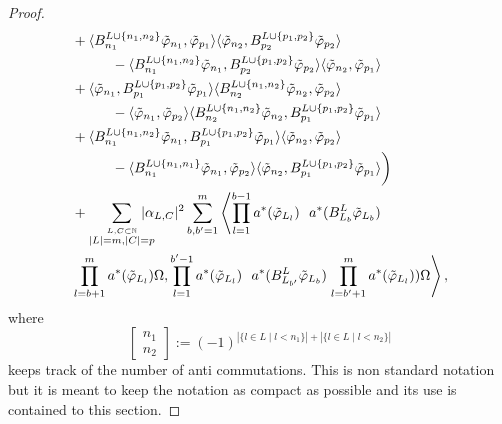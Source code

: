 \documentclass[b5paper,draft,openbib,12pt]{memoir}
\begin{document}
\begin{proof}
\begin{align}
  &+\langle B^{L\cup\{n_1,n_2\}}_{n_1}\tilde{\varphi}_{n_1},\tilde{\varphi}_{p_1} \rangle \langle  \tilde{\varphi}_{n_2}, B^{L\cup\{p_1,p_2\}}_{p_2}\tilde{\varphi}_{p_2}\rangle\\
  &\hspace{1cm}-\langle B^{L\cup\{n_1,n_2\}}_{n_1} \tilde{\varphi}_{n_1},B^{L\cup\{p_1,p_2\}}_{p_2}\tilde{\varphi}_{p_2} \rangle \langle  \tilde{\varphi}_{n_2}, \tilde{\varphi}_{p_1}\rangle \\
  & +\langle \tilde{\varphi}_{n_1},B^{L\cup\{p_1,p_2\}}_{p_1}\tilde{\varphi}_{p_1} \rangle \langle B^{L\cup\{n_1,n_2\}}_{n_2} \tilde{\varphi}_{n_2}, \tilde{\varphi}_{p_2}\rangle\\
  &\hspace{1cm}-\langle \tilde{\varphi}_{n_1},\tilde{\varphi}_{p_2} \rangle \langle B^{L\cup\{n_1,n_2\}}_{n_2} \tilde{\varphi}_{n_2},B^{L\cup\{p_1,p_2\}}_{p_1} \tilde{\varphi}_{p_1}\rangle \\
  & +\langle B^{L\cup\{n_1,n_2\}}_{n_1} \tilde{\varphi}_{n_1},B^{L\cup\{p_1,p_2\}}_{p_1}\tilde{\varphi}_{p_1} \rangle \langle  \tilde{\varphi}_{n_2}, \tilde{\varphi}_{p_2}\rangle\\
  &\hspace{1cm}-\langle B^{L\cup\{n_1,n_1\}}_{n_1} \tilde{\varphi}_{n_1},\tilde{\varphi}_{p_2} \rangle \langle  \tilde{\varphi}_{n_2},B^{L\cup\{p_1,p_2\}}_{p_1} \tilde{\varphi}_{p_1}\rangle \bigg)\\
&+\sum_{\overset{L,C\subset \mathbb{N}}{|L|=m,|C|=p}}\hspace{-0.4cm} |\alpha_{L,C}|^2
 \sum_{b,b'=1}^m 
\left\langle \prod_{l=1}^{b-1} a^*(\tilde{\varphi}_{L_l})  ~~ a^*(B^{L}_{L_b} \tilde{\varphi}_{L_b})\right.  \\\nonumber
&\prod_{l=b+1}^m a^*(\tilde{\varphi}_{L_l}) \Omega, 
\prod_{l=1}^{b'-1} a^*(\tilde{\varphi}_{L_l})  ~~ a^*(B_{L_{b'}}^{L} \tilde{\varphi}_{L_b})  \left.\prod_{l=b'+1}^m a^*(\tilde{\varphi}_{L_l}) ) \Omega\right\rangle,
\end{align}
where 
\begin{equation}
\left[\begin{matrix}n_1\\n_2\end{matrix}\right]:=(-1)^{|\{l\in L \mid l<n_1\}|+|\{l\in L \mid l<n_2\}|}
\end{equation} 
keeps track of the number of anti commutations. This is 
non standard notation but it is meant to keep the notation
as compact as possible and its use is 
contained to this section.


\end{proof}
\end{document}
